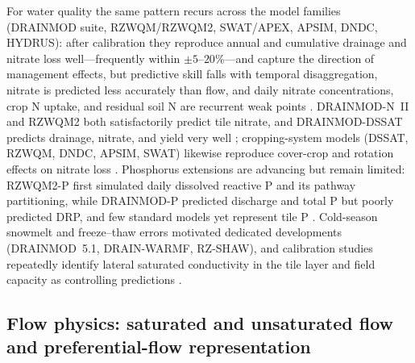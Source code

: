 For water quality the same pattern recurs across the model families
(\textsc{DRAINMOD} suite, RZWQM/RZWQM2, SWAT/APEX, APSIM, DNDC, HYDRUS): after
calibration they reproduce annual and cumulative drainage and nitrate loss
well---frequently within $\pm5$--$20\%$---and capture the direction of
management effects, but predictive skill falls with temporal disaggregation,
nitrate is predicted less accurately than flow, and daily nitrate
concentrations, crop N uptake, and residual soil N are recurrent weak points
\parencite{Youssef2018,Negm2014,Singh2020b,Dayyani2010,Ma2001,Liang2018,Ikenberry2017,Marjerison2016,Ojeda2018,Qi2025,Ma2007,Ahuja2007}.
\textsc{DRAINMOD-N~II} and RZWQM2 both satisfactorily predict tile nitrate,
and \textsc{DRAINMOD-DSSAT} predicts drainage, nitrate, and yield very well
\parencite{Du2017,Qi2012,Negm2017,Singh2022c}; cropping-system models
(DSSAT, RZWQM, DNDC, APSIM, SWAT) likewise reproduce cover-crop and
rotation effects on nitrate loss \parencite{Jeong2018,Ahmed2007b,Ale2012b,Pasley2021,Motarjemi2021}.
Phosphorus extensions are advancing but remain limited: RZWQM2-P first
simulated daily dissolved reactive P and its pathway partitioning, while
\textsc{DRAINMOD-P} predicted discharge and total P but poorly predicted DRP,
and few standard models yet represent tile P
\parencite{Sadhukhan2019,Grewal2025,BinShokrana2023b,Askar2021,Askar2025,Radcliffe2015,Wang2020b}.
Cold-season snowmelt and freeze--thaw errors motivated dedicated developments
(\textsc{DRAINMOD}~5.1, DRAIN-WARMF, RZ-SHAW), and calibration studies
repeatedly identify lateral saturated conductivity in the tile layer and field
capacity as controlling predictions
\parencite{Wang2006c,Dayyani2010b,Li2024b,Ma2007c,Malone2017}.

\subsection{Flow physics: saturated and unsaturated flow and preferential-flow representation}


